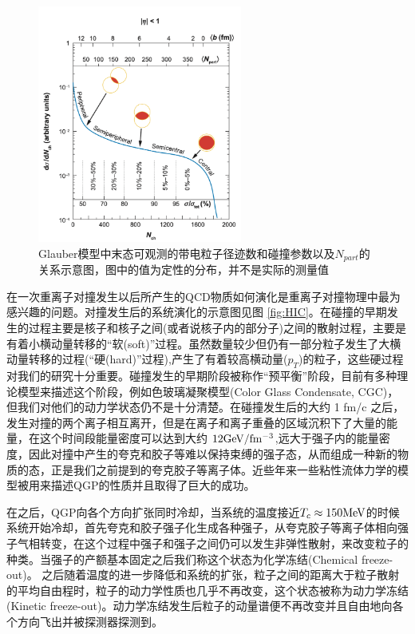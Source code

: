 \begin{figure}[htb]
    \begin{center}
    \includegraphics[width=0.6\textwidth,clip]{figures/Chapter1/Centrality.png}
    \end{center}
    \caption[中心度定义示意图]{Glauber模型中末态可观测的带电粒子径迹数和碰撞参数以及$N_{part}$的关系示意图，图中的值为定性的分布，并不是实际的测量值}
    \label{fig:Centrality}
\end{figure}

在一次重离子对撞发生以后所产生的QCD物质如何演化是重离子对撞物理中最为感兴趣的问题。对撞发生后的系统演化的示意图见图 \ref{fig:HIC}。在碰撞的早期发生的过程主要是核子和核子之间(或者说核子内的部分子)之间的散射过程，主要是有着小横动量转移的“软(soft)”过程。虽然数量较少但仍有一部分粒子发生了大横动量转移的过程(“硬(hard)”过程),产生了有着较高横动量($p_T$)的粒子，这些硬过程对我们的研究十分重要。碰撞发生的早期阶段被称作“预平衡”阶段，目前有多种理论模型来描述这个阶段，例如色玻璃凝聚模型(Color Glass Condensate, CGC)，但我们对他们的动力学状态仍不是十分清楚。在碰撞发生后的大约 1 fm/c 之后，发生对撞的两个离子相互离开，但是在离子和离子重叠的区域沉积下了大量的能量，在这个时间段能量密度可以达到大约 $12 {\rm GeV/fm^{-3}}$,远大于强子内的能量密度，因此对撞中产生的夸克和胶子等难以保持束缚的强子态，从而组成一种新的物质的态，正是我们之前提到的夸克胶子等离子体。近些年来一些粘性流体力学的模型被用来描述QGP的性质并且取得了巨大的成功。

在之后，QGP向各个方向扩张同时冷却，当系统的温度接近$T_c \approx 150 {\rm MeV}$的时候系统开始冷却，首先夸克和胶子强子化生成各种强子，从夸克胶子等离子体相向强子气相转变，在这个过程中强子和强子之间仍可以发生非弹性散射，来改变粒子的种类。当强子的产额基本固定之后我们称这个状态为化学冻结(Chemical freeze-out)。 之后随着温度的进一步降低和系统的扩张，粒子之间的距离大于粒子散射的平均自由程时，粒子的动力学性质也几乎不再改变，这个状态被称为动力学冻结(Kinetic freeze-out)。动力学冻结发生后粒子的动量谱便不再改变并且自由地向各个方向飞出并被探测器探测到。

